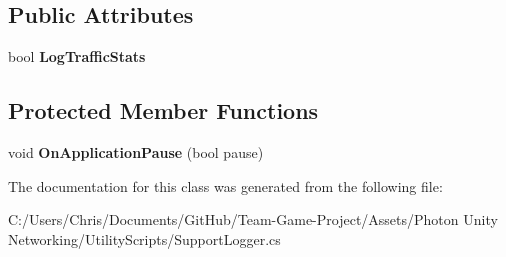\subsection*{Public Attributes}
\begin{DoxyCompactItemize}
\item 
bool {\bfseries Log\+Traffic\+Stats}\hypertarget{class_support_logging_a494d8a15f8657d606dd4c1dfbf0b9042}{}\label{class_support_logging_a494d8a15f8657d606dd4c1dfbf0b9042}

\end{DoxyCompactItemize}
\subsection*{Protected Member Functions}
\begin{DoxyCompactItemize}
\item 
void {\bfseries On\+Application\+Pause} (bool pause)\hypertarget{class_support_logging_a7a05e625a20d47cba4afe2b7376545f1}{}\label{class_support_logging_a7a05e625a20d47cba4afe2b7376545f1}

\end{DoxyCompactItemize}


The documentation for this class was generated from the following file\+:\begin{DoxyCompactItemize}
\item 
C\+:/\+Users/\+Chris/\+Documents/\+Git\+Hub/\+Team-\/\+Game-\/\+Project/\+Assets/\+Photon Unity Networking/\+Utility\+Scripts/Support\+Logger.\+cs\end{DoxyCompactItemize}
